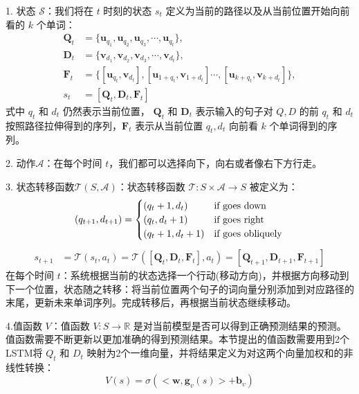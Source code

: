 1. 状态 $\mathcal{S}$：我们将在 $t$ 时刻的状态 $s_t$ 定义为当前的路径以及从当前位置开始向前看的 $k$ 个单词：
$$
\begin{aligned}
\mathbf{Q}_t &= \{\mathbf{u}_{q_1}, \mathbf{u}_{q_2}, \mathbf{u}_{q_3}, \cdots, \mathbf{u}_{q_t}\},\\
\mathbf{D}_t &= \{\mathbf{v}_{d_1}, \mathbf{v}_{d_2}, \mathbf{v}_{d_3},\cdots, \mathbf{v}_{d_t}\},\\
\mathbf{F}_t &= \{[\mathbf{u}_{q_t}, \mathbf{v}_{d_t}], [\mathbf{u}_{1+q_t},\mathbf{v}_{1+d_t}] \cdots, [\mathbf{u}_{k+q_t}, \mathbf{v}_{k+d_t}]\},\\
s_t &= [\mathbf{Q}_t, \mathbf{D}_t, \mathbf{F}_t]
\end{aligned}
$$
式中 $q_t$ 和 $d_t$ 仍然表示当前位置， $\mathbf{Q}_t$ 和 $\mathbf{D}_t$ 表示输入的句子对 $Q, D$ 的前 $q_t$ 和 $d_t$ 按照路径拉伸得到的序列，$\mathbf{F}_t$ 表示从当前位置 $q_t, d_t$ 向前看 $k$ 个单词得到的序列。

2. 动作$\mathcal{A}$：在每个时间 $t$，我们都可以选择向下，向右或者像右下方行走。

3. 状态转移函数$\mathcal{T}(S,\mathcal{A})$：状态转移函数 $\mathcal{T}:S\times \mathcal{A}\rightarrow S$ 被定义为：
$$
(q_{t+1}, d_{t+1}) =
\begin{cases}
(q_{t} + 1, d_{t}) &\text{if goes down} \\
(q_{t}, d_{t} + 1) &\text{if goes right}  \\
(q_{t} + 1, d_{t} + 1) &\text{if goes obliquely}
\end{cases} \\
$$
$$
\begin{aligned}
s_{t+1} &= \mathcal{T}(s_t, a_t) = \mathcal{T}([\mathbf{Q}_t, \mathbf{D}_t, \mathbf{F}_t], a_t) = [\mathbf{Q}_{t+1}, \mathbf{D}_{t+1},\mathbf{F}_{t+1}]
\end{aligned}
$$
在每个时间 $t$：系统根据当前的状态选择一个行动(移动方向)，并根据方向移动到下一个位置，状态随之转移：将当前位置两个句子的词向量分别添加到对应路径的末尾，更新未来单词序列。完成转移后，再根据当前状态继续移动。

4.值函数 $V$：值函数 $V: S\rightarrow \mathbb{R}$ 是对当前模型是否可以得到正确预测结果的预测。值函数需要不断更新以更加准确的得到预测结果。本节提出的值函数需要用到2个LSTM将 $Q_t$ 和 $D_t$ 映射为2个一维向量，并将结果定义为对这两个向量加权和的非线性转换：
\begin{equation}
\label{eq:MCTS_value}
V(s) = \sigma (<\mathbf{w}, \mathbf{g}_v(s)> + \mathbf{b}_v)
\end{equation}

